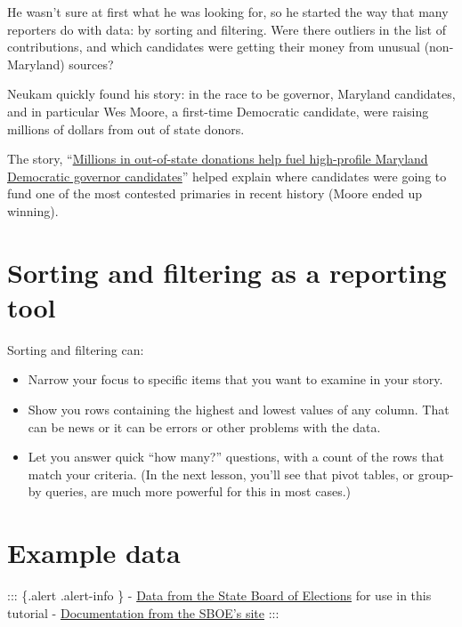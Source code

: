 \documentclass[
  letterpaper,
  DIV=11,
  numbers=noendperiod]{scrreprt}
\providecommand{\tightlist}{%
  \setlength{\itemsep}{0pt}\setlength{\parskip}{0pt}}\usepackage{longtable,booktabs,array}
\begin{document}
He wasn't sure at first what he was looking for, so he started the way
that many reporters do with data: by sorting and filtering. Were there
outliers in the list of contributions, and which candidates were getting
their money from unusual (non-Maryland) sources?

Neukam quickly found his story: in the race to be governor, Maryland
candidates, and in particular Wes Moore, a first-time Democratic
candidate, were raising millions of dollars from out of state donors.

The story,
``\href{https://cnsmaryland.org/2022/03/03/millions-in-out-of-state-donations-help-fuel-high-profile-maryland-democratic-governor-candidates/}{Millions
in out-of-state donations help fuel high-profile Maryland Democratic
governor candidates}'' helped explain where candidates were going to
fund one of the most contested primaries in recent history (Moore ended
up winning).

\hypertarget{sorting-and-filtering-as-a-reporting-tool}{%
\section{Sorting and filtering as a reporting
tool}\label{sorting-and-filtering-as-a-reporting-tool}}

Sorting and filtering can:

\begin{itemize}
\tightlist
\item
  Narrow your focus to specific items that you want to examine in your
  story.
\item
  Show you rows containing the highest and lowest values of any column.
  That can be news or it can be errors or other problems with the data.
\item
  Let you answer quick ``how many?'' questions, with a count of the rows
  that match your criteria. (In the next lesson, you'll see that pivot
  tables, or group-by queries, are much more powerful for this in most
  cases.)
\end{itemize}

\hypertarget{example-data}{%
\section{Example data}\label{example-data}}

::: \{.alert .alert-info \} -
\href{https://github.com/stephenneukam/CNS_Annapolis/tree/main/Campaign_finance}{Data
from the State Board of Elections} for use in this tutorial -
\href{https://campaignfinance.maryland.gov/Public/ViewReceiptsMain}{Documentation
from the SBOE's site} :::
\end{document}
